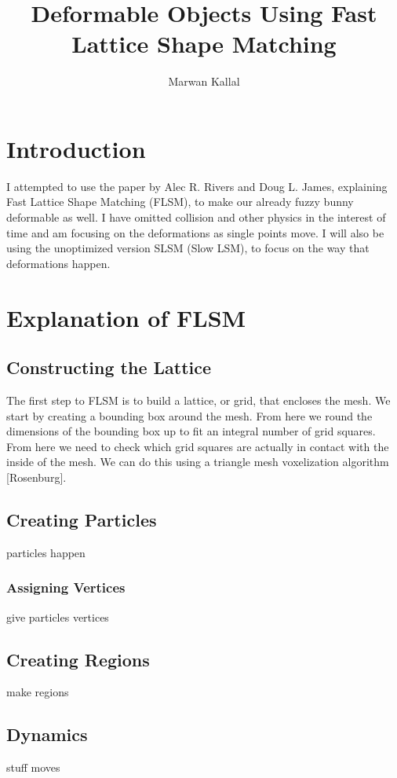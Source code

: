 \documentclass[12pt,a4paper]{article}
\begin{document}
	\title{Deformable Objects Using Fast Lattice Shape Matching}
	\author{Marwan Kallal}
	\date{}
	\maketitle
	
	\section{Introduction}
	I attempted to use the paper by Alec R. Rivers and Doug L. James, explaining Fast Lattice Shape Matching (FLSM), to make our already fuzzy bunny deformable as well. I have omitted collision and other physics in the interest of time and am focusing on the deformations as single points move. I will also be using the unoptimized version SLSM (Slow LSM), to focus on the way that deformations happen.
	
	\section{Explanation of FLSM}
	\subsection{Constructing the Lattice}
	The first step to FLSM is to build a lattice, or grid, that encloses the mesh. We start by creating a bounding box around the mesh. From here we round the dimensions of the bounding box up to fit an integral number of grid squares. From here we need to check which grid squares are actually in contact with the inside of the mesh. We can do this using a triangle mesh voxelization algorithm [Rosenburg]. 
	
	\subsection{Creating Particles}
	particles happen
	
	\subsubsection{Assigning Vertices}
	give particles vertices
	
	\subsection{Creating Regions}
	make regions
	
	\subsection{Dynamics}
	stuff moves
	
\end{document}
